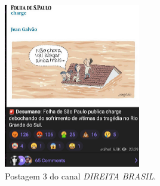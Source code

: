 \documentclass[portuguese]{textolivre}
\begin{document}
\begin{figure}[h!]
\begin{minipage}[t]{0.32\textwidth}
        \includegraphics[width=\linewidth]{Imagens/Fig30.png}
        \caption{Postagem 3 do canal \emph{DIREITA BRASIL}.}
        \label{fig-30}
    \end{minipage}

    \vspace{0.3cm} %


\end{figure}
\end{document}
